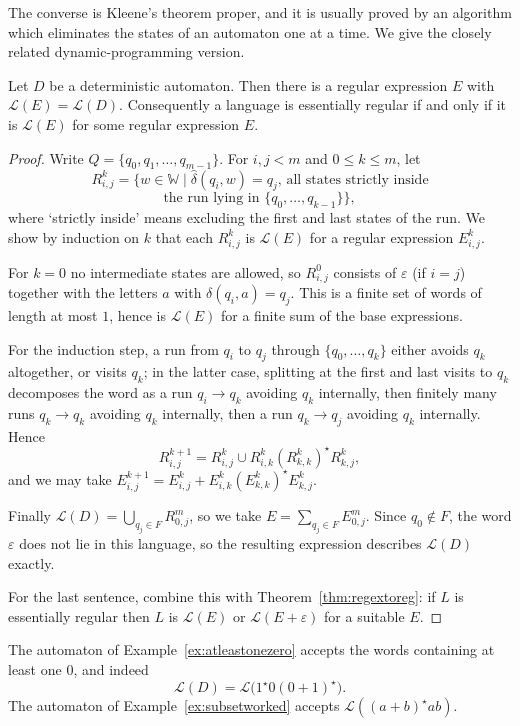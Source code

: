 \documentclass[a4paper]{scrartcl}
\newcommand{\WW}{\mathbb{W}}
\newcommand{\lang}{\mathcal{L}}
\newcommand{\eps}{\varepsilon}
\begin{document}
The converse is Kleene's theorem proper, and it is usually proved by an algorithm which eliminates the states of an automaton one at a time. We give the closely related dynamic-programming version.

\begin{theorem}[Kleene]\label{thm:kleene}
	Let $D$ be a deterministic automaton. Then there is a regular expression $E$ with $\lang(E) = \lang(D)$. Consequently a language is essentially regular if and only if it is $\lang(E)$ for some regular expression $E$.
\end{theorem}

\begin{proof}
	Write $Q = \{q_0, q_1, \dots, q_{m-1}\}$. For $i, j < m$ and $0 \leq k \leq m$, let
	$$R^k_{i,j} = \{w \in \WW \mid \hat\delta(q_i, w) = q_j \text{, all states strictly inside}$$
	$$\text{the run lying in } \{q_0, \dots, q_{k-1}\}\},$$
	where `strictly inside' means excluding the first and last states of the run. We show by induction on $k$ that each $R^k_{i,j}$ is $\lang(E)$ for a regular expression $E^k_{i,j}$.

	For $k = 0$ no intermediate states are allowed, so $R^0_{i,j}$ consists of $\eps$ (if $i = j$) together with the letters $a$ with $\delta(q_i,a) = q_j$. This is a finite set of words of length at most $1$, hence is $\lang(E)$ for a finite sum of the base expressions.

	For the induction step, a run from $q_i$ to $q_j$ through $\{q_0,\dots,q_k\}$ either avoids $q_k$ altogether, or visits $q_k$; in the latter case, splitting at the first and last visits to $q_k$ decomposes the word as a run $q_i \to q_k$ avoiding $q_k$ internally, then finitely many runs $q_k \to q_k$ avoiding $q_k$ internally, then a run $q_k \to q_j$ avoiding $q_k$ internally. Hence
	$$R^{k+1}_{i,j} = R^k_{i,j} \cup R^k_{i,k}\left(R^k_{k,k}\right)^\star R^k_{k,j},$$
	and we may take $E^{k+1}_{i,j} = E^k_{i,j} + E^k_{i,k}(E^k_{k,k})^\star E^k_{k,j}$.

	Finally $\lang(D) = \bigcup_{q_j \in F} R^m_{0,j}$, so we take $E = \sum_{q_j \in F} E^m_{0,j}$. Since $q_0 \notin F$, the word $\eps$ does not lie in this language, so the resulting expression describes $\lang(D)$ exactly.

	For the last sentence, combine this with Theorem~\ref{thm:regextoreg}: if $L$ is essentially regular then $L$ is $\lang(E)$ or $\lang(E + \eps)$ for a suitable $E$.
\end{proof}

\begin{example}
	The automaton of Example~\ref{ex:atleastonezero} accepts the words containing at least one $0$, and indeed
	$$\lang(D) = \lang\big(1^\star 0 (0+1)^\star\big).$$
	The automaton of Example~\ref{ex:subsetworked} accepts $\lang((a+b)^\star ab)$.
\end{example}
\end{document}
